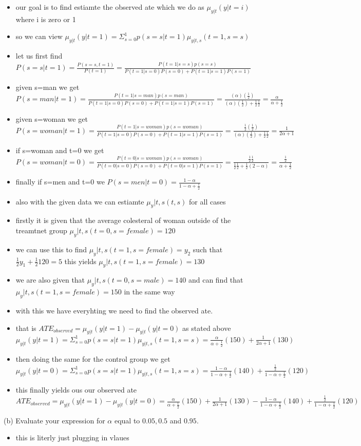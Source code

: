 \documentclass[10pt]{article}
\begin{document}
\begin{itemize}
    \item our goal is to find estiamte the observed ate which we do as $\mu_{y|t}(y|t=i)$ where i is zero or 1 
    \item so we can view $\mu_{y|t}(y|t=1)=\Sigma_{s=0}^{1}p(s=s|t=1)\mu_{y|t,s}(t=1,s=s)$ 
\item let us first find $P(s=s|t=1)=\frac{P(s=s,t=1)}{P(t=1)}=\frac{P(t=1|s=s)p(s=s)}{P(t=1|s=0)P(s=0)+P(t=1|s=1)P(s=1)}$
\item given s=man we get $P(s=man|t=1)=\frac{P(t=1|s=man)p(s=man)}{P(t=1|s=0)P(s=0)+P(t=1|s=1)P(s=1)}=\frac{(\alpha)(\frac{1}{2})}{(\alpha)(\frac{1}{2})+\frac{1}{2}\frac{1}{2}}=\frac{\alpha}{\alpha+\frac{1}{2}}$
\item given s=woman we get $P(s=woman|t=1)=\frac{P(t=1|s=woman)p(s=woman)}{P(t=1|s=0)P(s=0)+P(t=1|s=1)P(s=1)}=\frac{\frac{1}{2}(\frac{1}{2})}{(\alpha)(\frac{1}{2})+\frac{1}{2}\frac{1}{2}}=\frac{1}{2\alpha+1}$
\item if s=woman and t=0 we get $P(s=woman|t=0)=\frac{P(t=0|s=woman)p(s=woman)}{P(t=0|s=0)P(s=0)+P(t=0|s=1)P(s=1)}=
\frac{\frac{1}{2}\frac{1}{2}}{\frac{1}{2}\frac{1}{2}+\frac{1}{2}(2-\alpha)}=\frac{\frac{1}{2}}{\alpha+\frac{1}{2}}$
\item finally if s=men and t=0 we $P(s=men|t=0)=\frac{1-\alpha}{1-\alpha+\frac{1}{2}}$
\item also with the given data we can estiamte $\mu_y|t,s(t,s)$ for all cases 
\item firstly it is given that the average colesteral of woman outside of the treamtnet group $\mu_y|t,s(t=0,s=female)=120$
\item we can use this to find $\mu_y|t,s(t=1,s=female)=y_2$ such that $\frac{1}{2}y_1+\frac{1}{2}120=5$ this yields $\mu_y|t,s(t=1,s=female)=130$
\item we are also given that $\mu_y|t,s(t=0,s=male)=140$ and can find that $\mu_y|t,s(t=1,s=female)=150$ in the same way 
\item with this we have everyhting we need to find the observed ate. 
\item that is $ATE_{observed}=\mu_{y|t}(y|t=1)-\mu_{y|t}(y|t=0)$ as stated above $\mu_{y|t}(y|t=1)=\Sigma_{s=0}^{1}p(s=s|t=1)\mu_{y|t,s}(t=1,s=s)=\frac{\alpha}{\alpha+\frac{1}{2}}(150)+\frac{1}{2\alpha+1}(130)$
\item then doing the same for the control group we get $\mu_{y|t}(y|t=0)=\Sigma_{s=0}^{1}p(s=s|t=1)\mu_{y|t,s}(t=1,s=s)=\frac{1-\alpha}{1-\alpha+\frac{1}{2}}(140)+\frac{\frac{1}{2}}{1-\alpha+\frac{1}{2}}(120)$
\item this finally yields ous our observed ate $ATE_{observed}=\mu_{y|t}(y|t=1)-\mu_{y|t}(y|t=0)=\frac{\alpha}{\alpha+\frac{1}{2}}(150)+\frac{1}{2\alpha+1}(130)-\frac{1-\alpha}{1-\alpha+\frac{1}{2}}(140)+\frac{\frac{1}{2}}{1-\alpha+\frac{1}{2}}(120)$
\end{itemize}

(b) Evaluate your expression for $\alpha$ equal to $0.05,0.5$ and $0.95$.
\begin{itemize}
    \item this is literly just plugging in vlaues 
\end{itemize}
\end{document}
